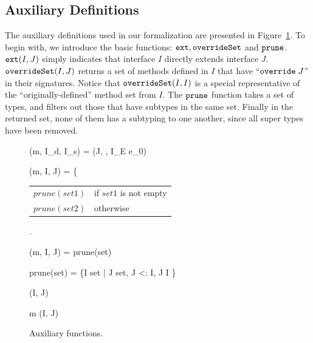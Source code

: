 \subsection{Auxiliary Definitions}\label{subsec:auxdefs}

The auxiliary definitions used in our formalization are presented in 
Figure~\ref{fig:auxfunc}. To begin with, we
introduce the basic functions: $\texttt{ext}, \texttt{overrideSet}$ and $\texttt{prune}$. $\texttt{ext}(I, J)$
simply indicates that interface $I$ directly extends interface $J$. 
$\texttt{overrideSet}(I, J)$ returns a set of methods defined in $I$ that have ``$\texttt{override} \; J$''
in their signatures. Notice that $\texttt{overrideSet}(I, I)$ is a special representative of
the ``originally-defined'' method set from $I$. The $\texttt{prune}$ function takes a set of
types, and filters out those that have subtypes in the same set. Finally in the returned set,
none of them has a subtyping to one another, since all super types have been removed.

\begin{figure}[t]
	\begin{mathpar}
		{\mbody(m, I_d, I_s) = (J,  \; , I_E \; e_0)}
	
	{\mostSpecific(m, I, J) = \left\{{\begin{tabular}{ll}
				$prune(set1)$ & if $set1$ is not empty \\ $prune(set2)$ & otherwise
			\end{tabular}}\right.}
	
		{\mostSpecificOverride(m, I, J) = prune(set)}
	
	prune(set) = \{I \in set \; | \; \nexists J \in set, J <: I, J \neq I \}
	
	{\ext(I, J)}
	
	{m \in \overrideSet(I, J)}
	\end{mathpar}
	\caption{Auxiliary functions.}\label{fig:auxfunc}
\end{figure}

